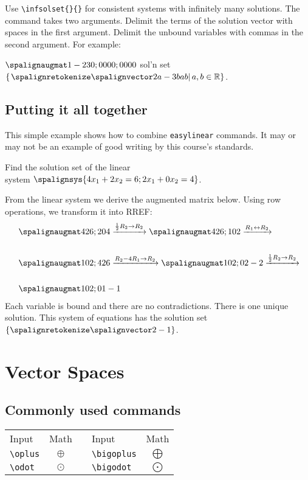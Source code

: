 \documentclass{article}
\begin{document}
Use \verb=\infsolset{}{}= for consistent systems with infinitely many solutions. The command takes two arguments. Delimit the terms of the solution vector with spaces in the first argument. Delimit the unbound variables with commas in the second argument. For example:

\LTXexample[style=A]
$\amat{1 -2 3 0; 0 0 0 0; 0 0 0 0}$ sol'n set $\infsolset{2a-3b a b}{a,b}$.
\endLTXexample

\subsection{Putting it all together}
This simple example shows how to combine \texttt{easylinear} commands. It may or may not be an example of good writing by this course's standards.
\LTXexample[style=A]
\begin{problem}Find the solution set of the linear\\ system $\spalignsys{4x_1 + 2x_2 = 6; 2x_1 + 0x_2 = 4}$.
\end{problem}

From the linear system we derive the augmented matrix below. Using row operations, we transform it into RREF:
\begin{align*}
&\amat{4 2 6; 2 0 4}
\rowscale{\frac{1}{2}}{2}
\amat{4 2 6; 1 0 2}
\rowswap{1}{2}\\~\\
&\amat{1 0 2; 4 2 6}
\rowop{}{2}{-}{4}{1}
\amat{1 0 2; 0 2 -2}
\rowscale{\frac{1}{2}}{2}\\~\\
&\amat{1 0 2; 0 1 -1}
\end{align*}
Each variable is bound and there are no contradictions. There is one unique solution. This system of equations has the solution set $\unisolset{2 -1}$.
\endLTXexample
\pagebreak
\section{Vector Spaces}
\subsection{Commonly used commands}
\begin{tabular}{lcclc}
Input &  Math & \qquad \qquad & Input & Math\\
\verb|\oplus| & $\oplus$ & \qquad \qquad & \verb|\bigoplus| & $\bigoplus$ \\
\verb|\odot| & $\odot$ & \qquad \qquad & \verb|\bigodot| & $\bigodot$ \\
\end{tabular}
\end{document}
